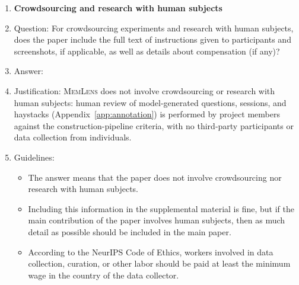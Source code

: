 \documentclass{article}
\newcommand{\bench}{\textsc{MemLens}}
\begin{document}
\begin{enumerate}
\item {\bf Crowdsourcing and research with human subjects}
    \item[] Question: For crowdsourcing experiments and research with human subjects, does the paper include the full text of instructions given to participants and screenshots, if applicable, as well as details about compensation (if any)?
    \item[] Answer: \answerNA{}
    \item[] Justification: \bench{} does not involve crowdsourcing or research with human subjects: human review of model-generated questions, sessions, and haystacks (Appendix~\ref{app:annotation}) is performed by project members against the construction-pipeline criteria, with no third-party participants or data collection from individuals.
    \item[] Guidelines:
    \begin{itemize}
        \item The answer \answerNA{} means that the paper does not involve crowdsourcing nor research with human subjects.
        \item Including this information in the supplemental material is fine, but if the main contribution of the paper involves human subjects, then as much detail as possible should be included in the main paper.
        \item According to the NeurIPS Code of Ethics, workers involved in data collection, curation, or other labor should be paid at least the minimum wage in the country of the data collector.
    \end{itemize}


\end{enumerate}
\end{document}
